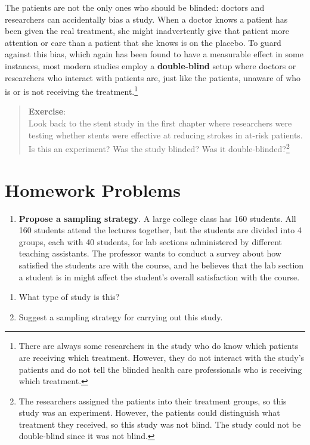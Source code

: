 \documentclass[
  letterpaper,
  DIV=11,
  numbers=noendperiod]{scrreprt}
\providecommand{\tightlist}{%
  \setlength{\itemsep}{0pt}\setlength{\parskip}{0pt}}\usepackage{longtable,booktabs,array}
\begin{document}
The patients are not the only ones who should be blinded: doctors and
researchers can accidentally bias a study. When a doctor knows a patient
has been given the real treatment, she might inadvertently give that
patient more attention or care than a patient that she knows is on the
placebo. To guard against this bias, which again has been found to have
a measurable effect in some instances, most modern studies employ a
\textbf{double-blind} setup where doctors or researchers who interact
with patients are, just like the patients, unaware of who is or is not
receiving the treatment.\footnote{There are always some researchers in
  the study who do know which patients are receiving which treatment.
  However, they do not interact with the study's patients and do not
  tell the blinded health care professionals who is receiving which
  treatment.}

\begin{quote}
\textbf{Exercise}:\\
Look back to the stent study in the first chapter where researchers were
testing whether stents were effective at reducing strokes in at-risk
patients. Is this an experiment? Was the study blinded? Was it
double-blinded?\footnote{The researchers assigned the patients into
  their treatment groups, so this study was an experiment. However, the
  patients could distinguish what treatment they received, so this study
  was not blind. The study could not be double-blind since it was not
  blind.}
\end{quote}

\section{Homework Problems}\label{homework-problems-3}

\begin{enumerate}
\def\labelenumi{\arabic{enumi}.}
\tightlist
\item
  \textbf{Propose a sampling strategy}. A large college class has 160
  students. All 160 students attend the lectures together, but the
  students are divided into 4 groups, each with 40 students, for lab
  sections administered by different teaching assistants. The professor
  wants to conduct a survey about how satisfied the students are with
  the course, and he believes that the lab section a student is in might
  affect the student's overall satisfaction with the course.
\end{enumerate}

\begin{enumerate}
\def\labelenumi{\alph{enumi}.}
\item
  What type of study is this?
\item
  Suggest a sampling strategy for carrying out this study.
\end{enumerate}
\end{document}
